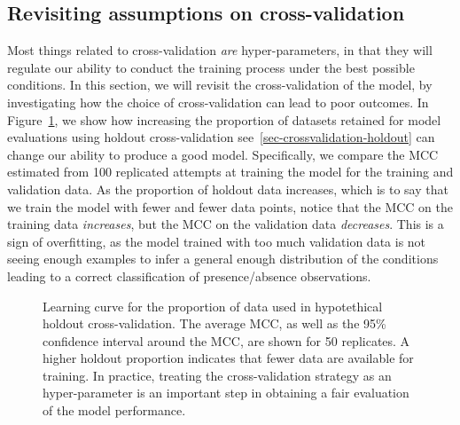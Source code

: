 \documentclass[
  letterpaper,
]{scrbook}
\begin{document}
\subsection{Revisiting assumptions on
cross-validation}\label{revisiting-assumptions-on-cross-validation}

Most things related to cross-validation \emph{are} hyper-parameters, in
that they will regulate our ability to conduct the training process
under the best possible conditions. In this section, we will revisit the
cross-validation of the model, by investigating how the choice of
cross-validation can lead to poor outcomes. In
Figure~\ref{fig-tuning-holdout}, we show how increasing the proportion
of datasets retained for model evaluations using holdout
cross-validation see~\ref{sec-crossvalidation-holdout} can change our
ability to produce a good model. Specifically, we compare the MCC
estimated from 100 replicated attempts at training the model for the
training and validation data. As the proportion of holdout data
increases, which is to say that we train the model with fewer and fewer
data points, notice that the MCC on the training data \emph{increases},
but the MCC on the validation data \emph{decreases}. This is a sign of
overfitting, as the model trained with too much validation data is not
seeing enough examples to infer a general enough distribution of the
conditions leading to a correct classification of presence/absence
observations.

\begin{figure}[pbt]


\caption{\label{fig-tuning-holdout}Learning curve for the proportion of
data used in hypotethical holdout cross-validation. The average MCC, as
well as the 95\% confidence interval around the MCC, are shown for 50
replicates. A higher holdout proportion indicates that fewer data are
available for training. In practice, treating the cross-validation
strategy as an hyper-parameter is an important step in obtaining a fair
evaluation of the model performance.}

\end{figure}%

\end{document}

